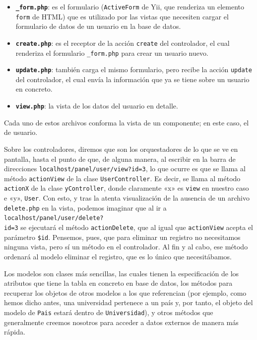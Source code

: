 \begin{itemize}
	\item \textbf{\texttt{\_form.php}}: es el formulario (\texttt{ActiveForm} de Yii, que renderiza un elemento \texttt{form} de HTML) que es utilizado por las vistas que necesiten cargar el formulario de datos de un usuario en la base de datos.
	\item \textbf{\texttt{create.php}}: es el receptor de la acción \texttt{create} del controlador, el cual renderiza el formulario \texttt{\_form.php} para crear un usuario nuevo.
	\item \textbf{\texttt{update.php}}: también carga el mismo formulario, pero recibe la acción \texttt{update} del controlador, el cual envía la información que ya se tiene sobre un usuario en concreto.
	\item \textbf{\texttt{view.php}}: la vista de los datos del usuario en detalle.
\end{itemize}

Cada uno de estos archivos conforma la vista de un componente; en este caso, el de usuario.

Sobre los controladores, diremos que son los orquestadores de lo que se ve en pantalla, hasta el punto de que, de alguna manera, al escribir en la barra de direcciones \texttt{localhost/panel/user/view?id=3}, lo que ocurre es que se llama al método \texttt{actionView} de la clase \texttt{UserController}. Es decir, se llama al método \texttt{actionX} de la clase \texttt{yController}, donde claramente «x» es \texttt{view} en nuestro caso e «y», \texttt{User}. Con esto, y tras la atenta visualización de la ausencia de un archivo \texttt{delete.php} en la vista, podemos imaginar que al ir a \texttt{localhost/panel/user/delete?\\id=3} se ejecutará el método \texttt{actionDelete}, que al igual que \texttt{actionView} acepta el parámetro \texttt{\$id}. Pensemos, pues, que para eliminar un registro no necesitamos ninguna vista, pero sí un método en el controlador. Al fin y al cabo, ese método ordenará al modelo eliminar el registro, que es lo único que necesitábamos.

Los modelos son clases más sencillas, las cuales tienen la especificación de los atributos que tiene la tabla en concreto en base de datos, los métodos para recuperar los objetos de otros modelos a los que referencian (por ejemplo, como hemos dicho antes, una universidad pertenece a un país y, por tanto, el objeto del modelo de \texttt{Pais} estará dentro de \texttt{Universidad}), y otros métodos que generalmente creemos nosotros para acceder a datos externos de manera más rápida.

